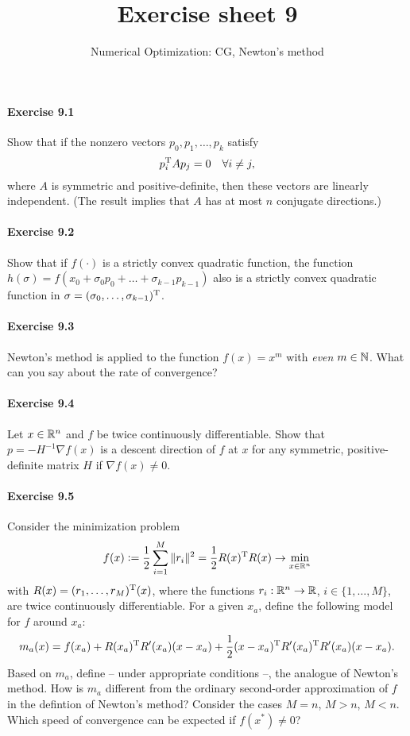 
\title{Exercise sheet 9}
\subtitle{Numerical Optimization: CG, Newton's method}

\maketitle

\paragraph{Exercise 9.1}  %
Show that if the nonzero vectors $p_0, p_1,\dots, p_k$ satisfy
\[
  p_i^{\text{\upshape T}} A p_j = 0 \quad\forall i\neq j,
\]
where $A$ is symmetric and positive-definite, then these vectors are linearly
independent. (The result implies that $A$ has at most $n$ conjugate
directions.)

\paragraph{Exercise 9.2}  %
Show that if $f(\cdot)$ is a strictly convex quadratic function, the function
$h(\sigma)=f(x_0+\sigma_0 p_0 + \dots +\sigma_{k-1}p_{k-1})$ also is a strictly
convex quadratic function in $\sigma=(\sigma_0,\dots,\sigma_{k-1})^{\text{\upshape T}}$.

\paragraph{Exercise 9.3}
Newton's method is applied to the function $f(x)=x^m$ with \emph{even}
$m\in\mathbb{N}$. What can you say about the rate of convergence?

\paragraph{Exercise 9.4}
Let $x \in \mathbb{R}^n$ and $f$ be twice continuously differentiable. Show that $p =
-H^{-1}\nabla f(x)$ is a descent direction of $f$ at $x$ for any
symmetric, positive-definite matrix $H$ if $\nabla f(x) \neq 0$.

\paragraph{Exercise 9.5}
Consider the minimization problem
\[
  f(x)\mathrel{\mathop:}= \frac{1}{2}\sum_{i=1}^M\|r_i\|^2 = \frac{1}{2}R(x)^{\text{\upshape T}} R(x) \to \min_{x\in\mathbb{R}^n}
\]
with $R(x)=(r_1,\dots,r_M)^{\text{\upshape T}}(x)$, where the functions $r_i:\mathbb{R}^n\to\mathbb{R}$, $i\in\{1,\dots,M\}$, are twice continuously differentiable. For a given $x_a$, define the following model for $f$ around $x_a$:
\[
  m_a(x) = f(x_a)
         + R(x_a)^{\text{\upshape T}} R'(x_a)(x-x_a)
         + \frac{1}{2} (x-x_a)^{\text{\upshape T}} R'(x_a)^{\text{\upshape T}} R'(x_a)(x-x_a).
\]
Based on $m_a$, define -- under appropriate conditions --, the analogue of
Newton's method. How is $m_a$ different from the ordinary second-order
approximation of $f$ in the defintion of Newton's method? Consider the cases
$M=n$, $M>n$, $M<n$. Which speed of convergence can be expected if $f(x^*)\neq 0$?

